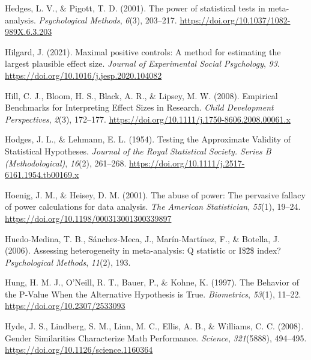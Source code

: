 \documentclass[
  oneside]{krantz}
\newlength{\cslhangindent}
\newlength{\cslentryspacingunit} %
\newenvironment{CSLReferences}[2] %
 {%
  \setlength{\parindent}{0pt}
  \ifodd #1
  \let\oldpar\par
  \def\par{\hangindent=\cslhangindent\oldpar}
  \fi
  \setlength{\parskip}{#2\cslentryspacingunit}
 }%
 {}
\begin{document}
\begin{CSLReferences}{1}{0}
\leavevmode{}%
Hedges, L. V., \& Pigott, T. D. (2001). The power of statistical tests
in meta-analysis. \emph{Psychological Methods}, \emph{6}(3), 203--217.
\url{https://doi.org/10.1037/1082-989X.6.3.203}

\leavevmode{}%
Hilgard, J. (2021). Maximal positive controls: {A} method for estimating
the largest plausible effect size. \emph{Journal of Experimental Social
Psychology}, \emph{93}. \url{https://doi.org/10.1016/j.jesp.2020.104082}

\leavevmode{}%
Hill, C. J., Bloom, H. S., Black, A. R., \& Lipsey, M. W. (2008).
Empirical {Benchmarks} for {Interpreting Effect Sizes} in {Research}.
\emph{Child Development Perspectives}, \emph{2}(3), 172--177.
\url{https://doi.org/10.1111/j.1750-8606.2008.00061.x}

\leavevmode{}%
Hodges, J. L., \& Lehmann, E. L. (1954). Testing the {Approximate
Validity} of {Statistical Hypotheses}. \emph{Journal of the Royal
Statistical Society. Series B (Methodological)}, \emph{16}(2), 261--268.
\url{https://doi.org/10.1111/j.2517-6161.1954.tb00169.x}

\leavevmode{}%
Hoenig, J. M., \& Heisey, D. M. (2001). The abuse of power: The
pervasive fallacy of power calculations for data analysis. \emph{The
American Statistician}, \emph{55}(1), 19--24.
\url{https://doi.org/10.1198/000313001300339897}

\leavevmode{}%
Huedo-Medina, T. B., Sánchez-Meca, J., Marín-Martínez, F., \& Botella,
J. (2006). Assessing heterogeneity in meta-analysis: {Q} statistic or
{I}\$2̂\$ index? \emph{Psychological Methods}, \emph{11}(2), 193.

\leavevmode{}%
Hung, H. M. J., O'Neill, R. T., Bauer, P., \& Kohne, K. (1997). The
{Behavior} of the {P-Value When} the {Alternative Hypothesis} is {True}.
\emph{Biometrics}, \emph{53}(1), 11--22.
\url{https://doi.org/10.2307/2533093}

\leavevmode{}%
Hyde, J. S., Lindberg, S. M., Linn, M. C., Ellis, A. B., \& Williams, C.
C. (2008). Gender {Similarities Characterize Math Performance}.
\emph{Science}, \emph{321}(5888), 494--495.
\url{https://doi.org/10.1126/science.1160364}


\end{CSLReferences}
\end{document}
